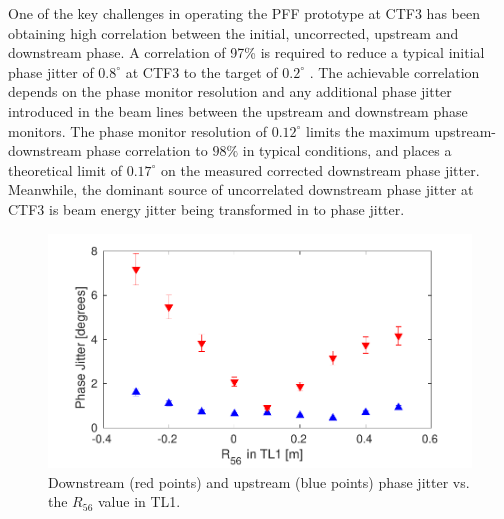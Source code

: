 \documentclass[%
 reprint,
superscriptaddress,
 amsmath,amssymb,
 prl,
]{revtex4-1}
\begin{document}

One of the key challenges in operating the PFF prototype at CTF3 has been 
obtaining high correlation between the initial, uncorrected, upstream and 
downstream phase. 
A correlation of 97\% is required to reduce a typical initial 
phase jitter of \(0.8^\circ\) at CTF3 to the target of \(0.2^\circ\) 
\cite{RobertsThesis}. 
The achievable correlation depends on the phase monitor resolution and any 
additional phase jitter introduced in the beam lines between the upstream and 
downstream phase monitors. The phase monitor resolution of \(0.12^\circ\) 
limits the maximum upstream-downstream phase correlation to
\(98\%\) in typical conditions, and places a theoretical limit of
\(0.17^\circ\) on the measured corrected downstream phase 
jitter. 
Meanwhile, the dominant source of uncorrelated downstream phase jitter at CTF3 
is beam energy jitter being transformed in to phase jitter. 

\begin{figure}
	\includegraphics[width=\columnwidth]{figs/r56Scan}%
	\caption{\label{fig:r56Scan}Downstream (red points) and upstream (blue 
		points) phase jitter vs. the \(R_{56}\) value in TL1. 
		}
\end{figure}
\end{document}
